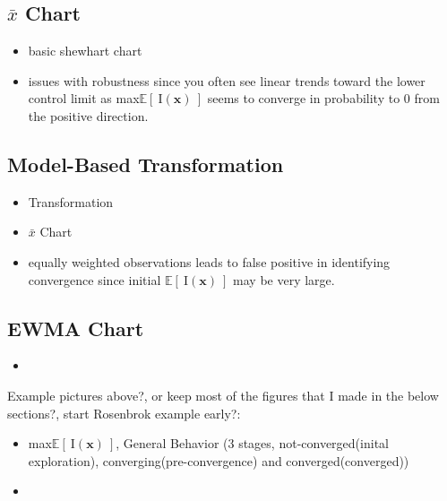 \documentclass[12pt]{article}
\def \EIx {
	\mathbb{E}\left[~\text{I}(\bm{x})~\right]
}
\begin{document}
	\subsection{$\bar{x}$ Chart}
		\begin{itemize}
		\item basic shewhart chart
		\item issues with robustness since you often see linear trends toward the lower control limit as max$\EIx$ seems to converge in probability to 0 from the positive direction.  
		\end{itemize}
	
	\subsection{Model-Based Transformation} %
		\begin{itemize}
		\item Transformation
		\item $\bar{x}$ Chart
		\item equally weighted observations leads to false positive in identifying convergence since initial $\EIx$ may be very large.
		\end{itemize}
	
	\subsection{EWMA Chart}%
		\begin{itemize}
		\item
		\end{itemize}
%
{\color{red} Example pictures above?, or keep most of the figures that I made in the below sections?, start Rosenbrok example early?:
\begin{itemize}
\item max$\EIx$, General Behavior (3 stages, not-converged(inital exploration), converging(pre-convergence) and converged(converged))
\item 
\end{itemize}
}
\end{document}
